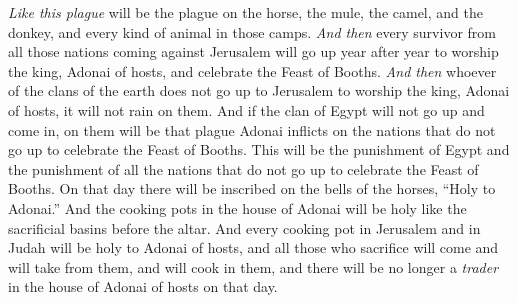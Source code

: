 \begin{biblechapter}
\verse \textit{Like this plague} will be the plague on the horse, the mule, the camel, and the donkey, and every kind of animal in those camps.
\verse \textit{And then} every survivor from all those nations coming against Jerusalem will go up year after year to worship the king, Adonai of hosts, and celebrate the Feast of Booths.
\verse \textit{And then} whoever of the clans of the earth does not go up to Jerusalem to worship the king, Adonai of hosts, it will not rain on them.
\verse And if the clan of Egypt will not go up and come in, on them will be that plague Adonai inflicts on the nations that do not go up to celebrate the Feast of Booths.
\verse This will be the punishment of Egypt and the punishment of all the nations that do not go up to celebrate the Feast of Booths.
\verse On that day there will be inscribed on the bells of the horses, “Holy to Adonai.” And the cooking pots in the house of Adonai will be holy like the sacrificial basins before the altar.
\verse And every cooking pot in Jerusalem and in Judah will be holy to Adonai of hosts, and all those who sacrifice will come and will take from them, and will cook in them, and there will be no longer a \textit{trader} in the house of Adonai of hosts on that day.
\end{biblechapter}

